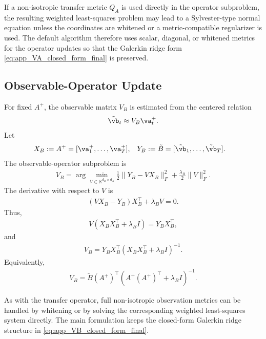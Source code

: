 \documentclass[twoside,11pt]{article}
\begin{document}
If a non-isotropic transfer metric $Q_A$ is used directly in the
operator subproblem, the resulting weighted least-squares problem may
lead to a Sylvester-type normal equation unless the coordinates are
whitened or a metric-compatible regularizer is used. The default
algorithm therefore uses scalar, diagonal, or whitened metrics for the
operator updates so that the Galerkin ridge form
\eqref{eq:app_VA_closed_form_final} is preserved.

\subsection{Observable-Operator Update}

For fixed $A^+$, the observable matrix $V_B$ is estimated from the
centered relation
\begin{align}
\tilde{\vb}_t
\approx
V_B\va_t^+.
\end{align}
Let
\begin{align}
X_B
&:=
A^+
=
[\va_1^+,\dots,\va_T^+],
&
Y_B
&:=
\tilde B
=
[\tilde{\vb}_1,\dots,\tilde{\vb}_T].
\label{eq:app_observable_design_matrices}
\end{align}
The observable-operator subproblem is
\begin{align}
V_B
=
\arg\min_{V\in\mathbb R^{d_B\times d_A}}
\frac12
\|Y_B - VX_B\|_F^2
+
\frac{\lambda_B}{2}
\|V\|_F^2.
\label{eq:app_observable_ridge_problem}
\end{align}
The derivative with respect to $V$ is
\begin{align}
(VX_B-Y_B)X_B^\top+\lambda_B V=0.
\label{eq:app_observable_gradient}
\end{align}
Thus,
\begin{align}
V(X_BX_B^\top+\lambda_B I)
=
Y_BX_B^\top,
\label{eq:app_observable_normal_equation}
\end{align}
and
\begin{align}
V_B
=
Y_BX_B^\top
(X_BX_B^\top+\lambda_B I)^{-1}.
\label{eq:app_observable_closed_form}
\end{align}
Equivalently,
\begin{align}
V_B
=
\tilde B(A^+)^\top
\left(
A^+(A^+)^\top
+
\lambda_B I
\right)^{-1}.
\label{eq:app_VB_closed_form_final}
\end{align}

As with the transfer operator, full non-isotropic observation metrics can
be handled by whitening or by solving the corresponding weighted
least-squares system directly. The main formulation keeps the
closed-form Galerkin ridge structure in
\eqref{eq:app_VB_closed_form_final}.
\end{document}
